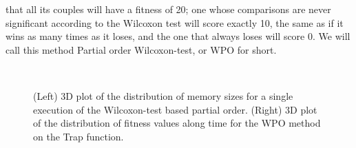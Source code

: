 \documentclass{llncs}
\begin{document}
that all its couples will have a fitness of 20; one whose comparisons
are never significant according to the Wilcoxon test will score
exactly 10, the same as if it wins as many times as it loses, and the
one that always loses will score 0. We will call this method
Partial order Wilcoxon-test, or {\sf WPO} for short.
\begin{figure}[!t] %
\centering
{}
~
\caption{(Left) 3D plot of the distribution of memory sizes for a single
execution of the Wilcoxon-test based partial order. (Right)
3D plot of the distribution of fitness values along time for the WPO
method on the Trap function. \label{fig:initial}}
\end{figure}
\end{document}
